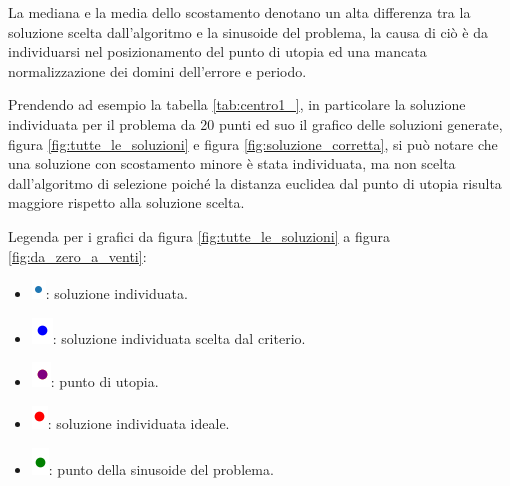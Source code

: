 \documentclass[a4paper,12pt]{report}
\begin{document}
La mediana e la media dello scostamento denotano un alta differenza tra la soluzione scelta dall'algoritmo e la sinusoide del problema, la causa di ciò è da individuarsi nel posizionamento del punto di utopia ed una mancata normalizzazione dei domini dell'errore e periodo.

Prendendo ad esempio la tabella \ref{tab:centro1_}, in particolare la soluzione individuata per il problema da 20 punti ed suo il grafico delle soluzioni generate, figura \ref{fig:tutte_le_soluzioni} e figura \ref{fig:soluzione_corretta}, si può notare che una soluzione con scostamento minore è stata individuata, ma non scelta dall'algoritmo di selezione poiché la distanza euclidea dal punto di utopia risulta maggiore rispetto alla soluzione scelta.

Legenda per i grafici da figura \ref{fig:tutte_le_soluzioni} a figura \ref{fig:da_zero_a_venti}:
\begin{itemize}
  \item \includegraphics{img/utility/matplotlib_markers/soluzione.png}: soluzione individuata.
  \item \includegraphics{img/utility/matplotlib_markers/soluzione_scelta.png}: soluzione individuata scelta dal criterio.
  \item \includegraphics{img/utility/matplotlib_markers/punto_utopia.png}:
  punto di utopia.
  \item \includegraphics{img/utility/matplotlib_markers/soluzione_ideale.png}: soluzione individuata ideale.
  \item \includegraphics{img/utility/matplotlib_markers/punto_sinusoide.png}: punto della sinusoide del problema.
\end{itemize}
\end{document}
